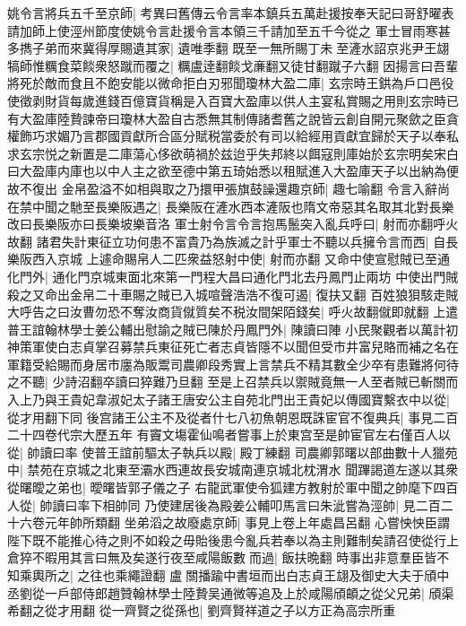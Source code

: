 姚令言將兵五千至京師|{
	考異曰舊傳云令言率本鎮兵五萬赴援按奉天記曰哥舒曜表請加師上使涇州節度使姚令言赴援令言本領三千請加至五千今從之}
軍士冒雨寒甚多擕子弟而來冀得厚賜遺其家|{
	遺唯季翻}
既至一無所賜丁未至滻水詔京兆尹王翃犒師惟糲食菜餤衆怒蹴而覆之|{
	糲盧逹翻餤戈亷翻又徒甘翻蹴子六翻}
因揚言曰吾輩將死於敵而食且不飽安能以微命拒白刃邪聞瓊林大盈二庫|{
	玄宗時王鉷為戶口邑役使徵剥財貨每歲進錢百億寶貨稱是入百寶大盈庫以供人主宴私賞賜之用則玄宗時已有大盈庫陸贄諫帝曰瓊林大盈自古悉無其制傳諸耆舊之說皆云創自開元聚歛之臣貪權飾巧求媚乃言郡國貢獻所合區分賦税當委於有司以給經用貢獻宜歸於天子以奉私求玄宗悦之新置是二庫蕩心侈欲萌禍於兹迨乎失邦終以餌寇則庫始於玄宗明矣宋白曰大盈庫内庫也以中人主之欲至德中第五琦始悉以租賦進入大盈庫天子以出納為便故不復出}
金帛盈溢不如相與取之乃擐甲張旗鼓譟還趣京師|{
	趣七喻翻}
令言入辭尚在禁中聞之馳至長樂阪遇之|{
	長樂阪在滻水西本滻阪也隋文帝惡其名取其北對長樂改曰長樂阪亦曰長樂坡樂音洛}
軍士射令言令言抱馬鬛突入亂兵呼曰|{
	射而亦翻呼火故翻}
諸君失計東征立功何患不富貴乃為族滅之計乎軍士不聽以兵擁令言而西|{
	自長樂阪西入京城}
上遽命賜帛人二匹衆益怒射中使|{
	射而亦翻}
又命中使宣慰賊已至通化門外|{
	通化門京城東面北來第一門程大昌曰通化門北去丹鳳門止兩坊}
中使出門賊殺之又命出金帛二十車賜之賊已入城喧聲浩浩不復可遏|{
	復扶又翻}
百姓狼狽駭走賊大呼告之曰汝曹勿恐不奪汝商貨僦質矣不税汝間架陌錢矣|{
	呼火故翻僦即就翻}
上遣普王誼翰林學士姜公輔出慰諭之賊已陳於丹鳳門外|{
	陳讀曰陣}
小民聚觀者以萬計初神策軍使白志貞掌召募禁兵東征死亡者志貞皆隱不以聞但受市井富兒賂而補之名在軍籍受給賜而身居市廛為販鬻司農卿段秀實上言禁兵不精其數全少卒有患難將何待之不聽|{
	少詩沼翻卒讀曰猝難乃旦翻}
至是上召禁兵以禦賊竟無一人至者賊已斬關而入上乃與王貴妃韋淑妃太子諸王唐安公主自苑北門出王貴妃以傳國寶繫衣中以從|{
	從才用翻下同}
後宫諸王公主不及從者什七八初魚朝恩既誅宦官不復典兵|{
	事見二百二十四卷代宗大歷五年}
有竇文塲霍仙鳴者嘗事上於東宫至是帥宦官左右僅百人以從|{
	帥讀曰率}
使普王誼前驅太子執兵以殿|{
	殿丁練翻}
司農卿郭曙以部曲數十人獵苑中|{
	禁苑在京城之北東至灞水西連故長安城南連京城北枕渭水}
聞蹕謁道左遂以其衆從曙曖之弟也|{
	曖曙皆郭子儀之子}
右龍武軍使令狐建方教射於軍中聞之帥麾下四百人從|{
	帥讀曰率下相帥同}
乃使建居後為殿姜公輔叩馬言曰朱泚嘗為涇帥|{
	見二百二十六卷元年帥所類翻}
坐弟滔之故廢處京師|{
	事見上卷上年處昌呂翻}
心嘗怏怏臣謂陛下既不能推心待之則不如殺之毋貽後患今亂兵若奉以為主則難制矣請召使從行上倉猝不暇用其言曰無及矣遂行夜至咸陽飯數而過|{
	飯扶晩翻}
時事出非意羣臣皆不知乘輿所之|{
	之往也乘繩證翻}
盧關播踰中書垣而出白志貞王翃及御史大夫于頎中丞劉從一戶部侍郎趙贊翰林學士陸贄吴通微等追及上於咸陽頎頔之從父兄弟|{
	頎渠希翻之從才用翻}
從一齊賢之從孫也|{
	劉齊賢祥道之子以方正為高宗所重}
